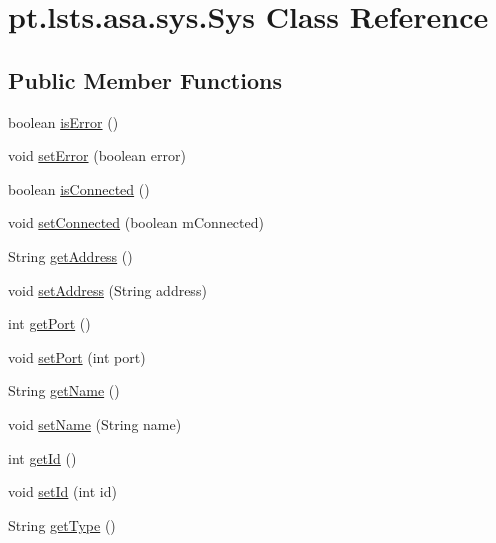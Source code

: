 \hypertarget{classpt_1_1lsts_1_1asa_1_1sys_1_1Sys}{}\section{pt.\+lsts.\+asa.\+sys.\+Sys Class Reference}
\label{classpt_1_1lsts_1_1asa_1_1sys_1_1Sys}
\subsection*{Public Member Functions}
\begin{DoxyCompactItemize}
\item 
boolean \hyperlink{classpt_1_1lsts_1_1asa_1_1sys_1_1Sys_a84f5d6feafbc6b694d19064657566e49}{is\+Error} ()
\item 
void \hyperlink{classpt_1_1lsts_1_1asa_1_1sys_1_1Sys_a0b8b78b965c43365638c569f07c04778}{set\+Error} (boolean error)
\item 
boolean \hyperlink{classpt_1_1lsts_1_1asa_1_1sys_1_1Sys_afa49c29d6fe25c3ab3ec6ed183bdc32f}{is\+Connected} ()
\item 
void \hyperlink{classpt_1_1lsts_1_1asa_1_1sys_1_1Sys_af1d70424cbacf2700b1e5975a736c30d}{set\+Connected} (boolean m\+Connected)
\item 
String \hyperlink{classpt_1_1lsts_1_1asa_1_1sys_1_1Sys_adbc78a7cd0993e46ec9ac727a1460962}{get\+Address} ()
\item 
void \hyperlink{classpt_1_1lsts_1_1asa_1_1sys_1_1Sys_acd0c90a71fcdccda990ffe06ab3abc7a}{set\+Address} (String address)
\item 
int \hyperlink{classpt_1_1lsts_1_1asa_1_1sys_1_1Sys_a1c0428223aa7fd8b35917dad4fae462e}{get\+Port} ()
\item 
void \hyperlink{classpt_1_1lsts_1_1asa_1_1sys_1_1Sys_a5d81c32b775190afa9bfb290c1ed39d8}{set\+Port} (int port)
\item 
String \hyperlink{classpt_1_1lsts_1_1asa_1_1sys_1_1Sys_a931c657141f731d81563d56daa0e9282}{get\+Name} ()
\item 
void \hyperlink{classpt_1_1lsts_1_1asa_1_1sys_1_1Sys_a67f81be4534ee073cffc9a8ab4ee0be6}{set\+Name} (String name)
\item 
int \hyperlink{classpt_1_1lsts_1_1asa_1_1sys_1_1Sys_add2c719c1cf588ed4b37c181bcc7248f}{get\+Id} ()
\item 
void \hyperlink{classpt_1_1lsts_1_1asa_1_1sys_1_1Sys_a60483645f6710a59a6d79eb4a7d1df10}{set\+Id} (int id)
\item 
String \hyperlink{classpt_1_1lsts_1_1asa_1_1sys_1_1Sys_a8b6ef47896e7dfe01c872ef2229f96c0}{get\+Type} ()

\end{DoxyCompactItemize}
